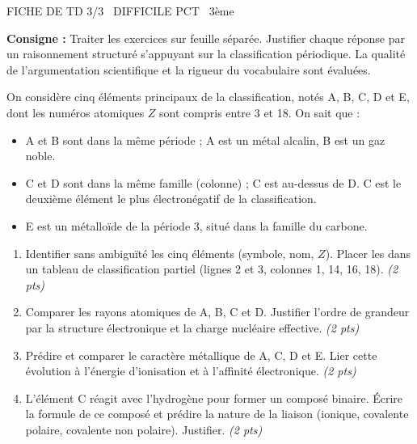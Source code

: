 \documentclass[11pt]{article}
\begin{document}
\begin{tcolorbox}[enhanced,colback=popink,colframe=popink,arc=10pt,boxrule=0pt,left=12pt,right=12pt,top=9pt,bottom=9pt]
{\color{white}\popxbold\small FICHE DE TD 3/3 \textbullet\ DIFFICILE \hfill PCT \textbullet\ 3ème\par}
\end{tcolorbox}
\vspace{4pt}
\noindent\textbf{Consigne :} Traiter les exercices sur feuille séparée. Justifier chaque réponse par un raisonnement structuré s'appuyant sur la classification périodique. La qualité de l'argumentation scientifique et la rigueur du vocabulaire sont évaluées.

\begin{exercice}
On considère cinq éléments principaux de la classification, notés A, B, C, D et E, dont les numéros atomiques $Z$ sont compris entre 3 et 18. On sait que :
\begin{itemize}
    \item A et B sont dans la même période ; A est un métal alcalin, B est un gaz noble.
    \item C et D sont dans la même famille (colonne) ; C est au-dessus de D. C est le deuxième élément le plus électronégatif de la classification.
    \item E est un métalloïde de la période 3, situé dans la famille du carbone.
\end{itemize}
\begin{enumerate}
    \item Identifier sans ambiguïté les cinq éléments (symbole, nom, $Z$). Placer les dans un tableau de classification partiel (lignes 2 et 3, colonnes 1, 14, 16, 18). \textit{(2 pts)}
    \item Comparer les rayons atomiques de A, B, C et D. Justifier l'ordre de grandeur par la structure électronique et la charge nucléaire effective. \textit{(2 pts)}
    \item Prédire et comparer le caractère métallique de A, C, D et E. Lier cette évolution à l'énergie d'ionisation et à l'affinité électronique. \textit{(2 pts)}
    \item L'élément C réagit avec l'hydrogène pour former un composé binaire. Écrire la formule de ce composé et prédire la nature de la liaison (ionique, covalente polaire, covalente non polaire). Justifier. \textit{(2 pts)}
\end{enumerate}
\end{exercice}
\end{document}
